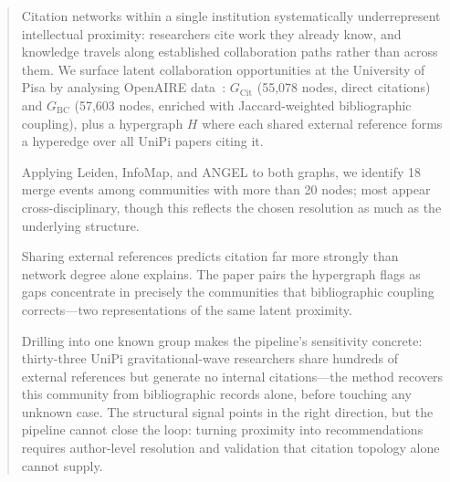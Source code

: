 \begin{abstract}
Citation networks within a single institution systematically underrepresent intellectual proximity: researchers cite work they already know, and knowledge travels along established collaboration paths rather than across them. We surface latent collaboration opportunities at the University of Pisa by analysing OpenAIRE data~\cite{OpenAIRE_graph_9_0_1}: $G_{\mathrm{Cit}}$ (55,078 nodes, direct citations) and $G_{\mathrm{BC}}$ (57,603 nodes, enriched with Jaccard-weighted bibliographic coupling), plus a hypergraph $H$ where each shared external reference forms a hyperedge over all UniPi papers citing it.

Applying Leiden, InfoMap, and ANGEL to both graphs, we identify 18 merge events among communities with more than 20 nodes; most appear cross-disciplinary, though this reflects the chosen resolution as much as the underlying structure.

Sharing external references predicts citation far more strongly than network degree alone explains. The paper pairs the hypergraph flags as gaps concentrate in precisely the communities that bibliographic coupling corrects---two representations of the same latent proximity.

Drilling into one known group makes the pipeline's sensitivity concrete: thirty-three UniPi gravitational-wave researchers share hundreds of external references but generate no internal citations---the method recovers this community from bibliographic records alone, before touching any unknown case. The structural signal points in the right direction, but the pipeline cannot close the loop: turning proximity into recommendations requires author-level resolution and validation that citation topology alone cannot supply.
\end{abstract}